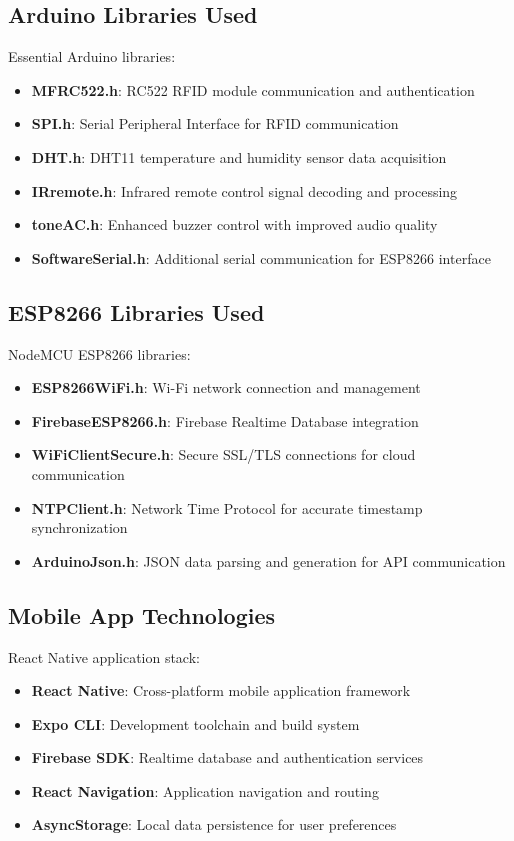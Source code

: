 \documentclass[12pt,a4paper]{report}
\begin{document}
\subsection*{Arduino Libraries Used}
\noindent Essential Arduino libraries:
\begin{itemize}
\item \textbf{MFRC522.h}: RC522 RFID module communication and authentication
\item \textbf{SPI.h}: Serial Peripheral Interface for RFID communication
\item \textbf{DHT.h}: DHT11 temperature and humidity sensor data acquisition
\item \textbf{IRremote.h}: Infrared remote control signal decoding and processing
\item \textbf{toneAC.h}: Enhanced buzzer control with improved audio quality
\item \textbf{SoftwareSerial.h}: Additional serial communication for ESP8266 interface
\end{itemize}

\subsection*{ESP8266 Libraries Used}
\noindent NodeMCU ESP8266 libraries:
\begin{itemize}
\item \textbf{ESP8266WiFi.h}: Wi-Fi network connection and management
\item \textbf{FirebaseESP8266.h}: Firebase Realtime Database integration
\item \textbf{WiFiClientSecure.h}: Secure SSL/TLS connections for cloud communication
\item \textbf{NTPClient.h}: Network Time Protocol for accurate timestamp synchronization
\item \textbf{ArduinoJson.h}: JSON data parsing and generation for API communication
\end{itemize}

\subsection*{Mobile App Technologies}
\noindent React Native application stack:
\begin{itemize}
\item \textbf{React Native}: Cross-platform mobile application framework
\item \textbf{Expo CLI}: Development toolchain and build system
\item \textbf{Firebase SDK}: Realtime database and authentication services
\item \textbf{React Navigation}: Application navigation and routing
\item \textbf{AsyncStorage}: Local data persistence for user preferences
\end{itemize}
\end{document}
